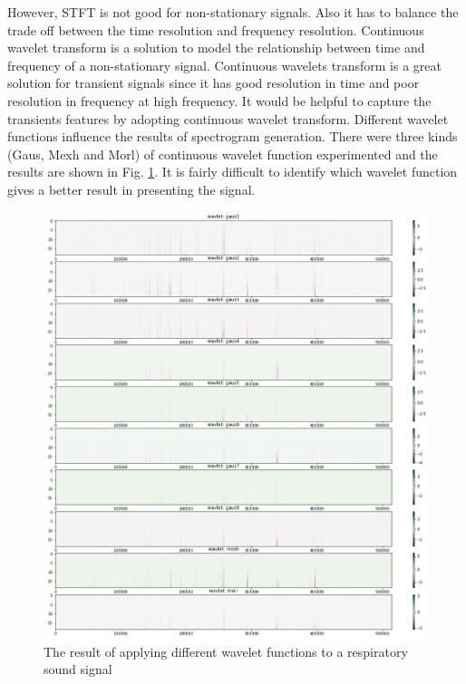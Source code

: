 However, STFT is not good for non-stationary signals. Also it has to balance the trade off between the time resolution and frequency resolution. Continuous wavelet transform is a solution to model the relationship between time and frequency of a non-stationary signal. Continuous wavelets transform is a great solution for transient signals since it has good resolution in time and poor resolution in frequency at high frequency. It would be helpful to capture the transients features by adopting continuous wavelet transform. Different wavelet functions influence the results of spectrogram generation. There were three kinds (Gaus, Mexh and Morl) of continuous wavelet function experimented and the results are shown in Fig. \ref{fig:wavelet_functions}. It is fairly difficult to identify which wavelet function gives a better result in presenting the signal.
\begin{figure}[h]
    \centerline{\includegraphics[scale=0.45]{figures/wavelet_trans_wav_func.png}}
    \caption{The result of applying different wavelet functions to a respiratory sound signal}
    \label{fig:wavelet_functions}
\end{figure}

\clearpage
